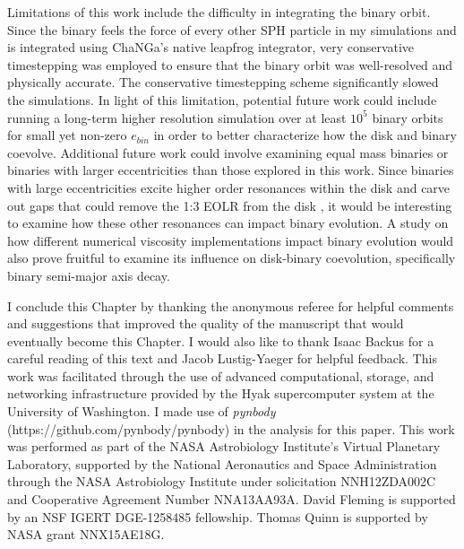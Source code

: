 Limitations of this work include the difficulty in integrating the binary orbit.  Since the binary feels the force of every other SPH particle in my simulations and is 
integrated using ChaNGa's native leapfrog integrator, very conservative timestepping was employed to ensure that the binary orbit was well-resolved and 
physically accurate.  The conservative timestepping scheme significantly slowed the simulations.  In light of this limitation, potential future work could include 
running a long-term higher resolution simulation over at least $10^5$ binary orbits for small yet non-zero $e_{bin}$ in order to better 
characterize how the disk and binary coevolve.  Additional future work could involve examining equal mass binaries or binaries with larger eccentricities than 
those explored in this work.  Since binaries with large eccentricities excite higher order resonances within the disk \citep[e.g.][]{Artymowicz1992,Artymowicz2000} and carve out 
gaps that could remove the 1:3 EOLR from the disk \citep{Artymowicz1994}, it would be interesting to examine how these other resonances can impact binary evolution.  
A study on how different numerical viscosity implementations impact binary evolution would also prove fruitful to examine its influence on disk-binary 
coevolution, specifically binary semi-major axis decay.

I conclude this Chapter by thanking the anonymous referee for helpful comments and suggestions that improved the quality
of the manuscript that would eventually become this Chapter. I would also like to thank Isaac Backus for a careful reading of this text and
Jacob Lustig-Yaeger for helpful feedback. 
This work was facilitated through the use of advanced computational, storage, and networking
infrastructure provided by the Hyak supercomputer system at the
University of Washington.  I made use of {\em pynbody}
(https://github.com/pynbody/pynbody) in the analysis for this paper.
This work was performed as part of the NASA Astrobiology Institute's
Virtual Planetary Laboratory, supported by the National Aeronautics
and Space Administration through the NASA Astrobiology Institute under
solicitation NNH12ZDA002C and Cooperative Agreement Number
NNA13AA93A.  David Fleming is supported by an NSF IGERT DGE-1258485 fellowship.
Thomas Quinn is supported by NASA grant NNX15AE18G.